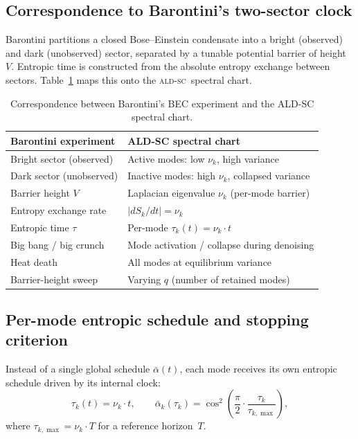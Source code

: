 \documentclass[11pt]{article}
\newcommand{\ALDSC}{\textsc{ald-sc}}
\begin{document}
    \subsection{Correspondence to Barontini's two-sector clock}
    \label{sec:barontini_mapping}
    Barontini partitions a closed Bose--Einstein condensate into a
    bright (observed) and dark (unobserved) sector, separated by a
    tunable potential barrier of height~$V$. Entropic time is
    constructed from the absolute entropy exchange between sectors.
    Table~\ref{tab:barontini} maps this onto the \ALDSC~spectral
    chart.

    \begin{table}[ht]
    \centering
    \small
    \caption{Correspondence between Barontini's BEC experiment and the
    ALD-SC spectral chart.}
    \label{tab:barontini}
    \begin{tabular}{ll}
    \toprule
    \textbf{Barontini experiment} & \textbf{ALD-SC spectral chart} \\
    \midrule
    Bright sector (observed) & Active modes: low $\nu_k$, high variance \\
    Dark sector (unobserved) & Inactive modes: high $\nu_k$, collapsed variance \\
    Barrier height $V$ & Laplacian eigenvalue $\nu_k$ (per-mode barrier) \\
    Entropy exchange rate & $|dS_k/dt| = \nu_k$ \\
    Entropic time $\tau$ & Per-mode $\tau_k(t) = \nu_k \cdot t$ \\
    Big bang / big crunch & Mode activation / collapse during denoising \\
    Heat death & All modes at equilibrium variance \\
    Barrier-height sweep & Varying $q$ (number of retained modes) \\
    \bottomrule
    \end{tabular}
    \end{table}

    \subsection{Per-mode entropic schedule and stopping criterion}
    \label{sec:per_mode_schedule}
    Instead of a single global schedule $\bar\alpha(t)$, each mode
    receives its own entropic schedule driven by its internal clock:
    \[\tau_k(t) = \nu_k \cdot t, \qquad
    \bar\alpha_k(\tau_k) = \cos^2\!\left(\frac{\pi}{2}\cdot\frac{\tau_k}{\tau_{k,\max}}\right),\]
    where $\tau_{k,\max} = \nu_k \cdot T$ for a reference horizon~$T$.
\end{document}
